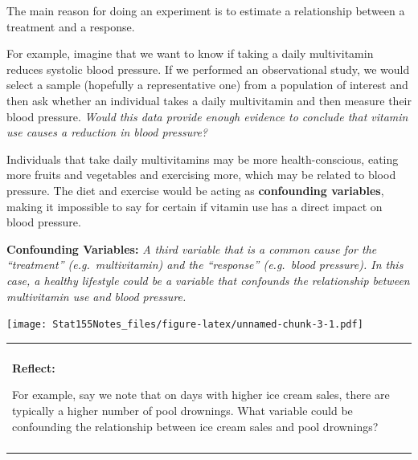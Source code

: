 \documentclass[]{book}
\newenvironment{Shaded}{\begin{snugshade}}{\end{snugshade}}
\newcommand{\CharTok}[1]{\textcolor[rgb]{0.31,0.60,0.02}{#1}}
\newcommand{\DataTypeTok}[1]{\textcolor[rgb]{0.13,0.29,0.53}{#1}}
\newcommand{\KeywordTok}[1]{\textcolor[rgb]{0.13,0.29,0.53}{\textbf{#1}}}
\newcommand{\NormalTok}[1]{#1}
\newcommand{\OperatorTok}[1]{\textcolor[rgb]{0.81,0.36,0.00}{\textbf{#1}}}
\newcommand{\OtherTok}[1]{\textcolor[rgb]{0.56,0.35,0.01}{#1}}
\newcommand{\StringTok}[1]{\textcolor[rgb]{0.31,0.60,0.02}{#1}}
\newenvironment{reflect}
{
    \begin{center}
    
    \begin{tabular}{|p{0.8\textwidth}|}
    \rowcolor{LightBlue}
    \hline\\
    \rowcolor{LightBlue}
    \textbf{Reflect:}
}
{
    \\\rowcolor{LightBlue}
    \\\hline
    \end{tabular} 
    \end{center}
}
\begin{document}
The main reason for doing an experiment is to estimate a relationship between a treatment and a response.

For example, imagine that we want to know if taking a daily multivitamin reduces systolic blood pressure. If we performed an observational study, we would select a sample (hopefully a representative one) from a population of interest and then ask whether an individual takes a daily multivitamin and then measure their blood pressure. \emph{Would this data provide enough evidence to conclude that vitamin use causes a reduction in blood pressure?}

Individuals that take daily multivitamins may be more health-conscious, eating more fruits and vegetables and exercising more, which may be related to blood pressure. The diet and exercise would be acting as \textbf{confounding variables}, making it impossible to say for certain if vitamin use has a direct impact on blood pressure.

\textbf{Confounding Variables:} \emph{A third variable that is a common cause for the ``treatment'' (e.g.~multivitamin) and the ``response'' (e.g.~blood pressure). In this case, a healthy lifestyle could be a variable that confounds the relationship between multivitamin use and blood pressure.}

\begin{Shaded}
\end{Shaded}

\texttt{[image: Stat155Notes\_files/figure-latex/unnamed-chunk-3-1.pdf]}

\begin{reflect}
For example, say we note that on days with higher ice cream sales, there
are typically a higher number of pool drownings. What variable could be
confounding the relationship between ice cream sales and pool drownings?
\end{reflect}
\end{document}
